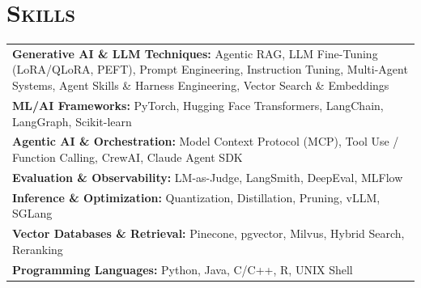 \documentclass[letterpaper,11pt]{article} %
\begin{document}
\section{\Large\bf\textsc{Skills}}
\begin{tabular}{p{18.5cm}}
{\bf Generative AI \& LLM Techniques:} Agentic RAG, LLM Fine-Tuning (LoRA/QLoRA, PEFT), Prompt Engineering, Instruction Tuning, Multi-Agent Systems, Agent Skills \& Harness Engineering, Vector Search \& Embeddings\\
{\bf ML/AI Frameworks:} PyTorch, Hugging Face Transformers, LangChain, LangGraph, Scikit-learn \\
{\bf Agentic AI \& Orchestration:} Model Context Protocol (MCP), Tool Use / Function Calling, CrewAI, Claude Agent SDK\\
{\bf Evaluation \& Observability:} LM-as-Judge, LangSmith, DeepEval, MLFlow\\
{\bf Inference \& Optimization:} Quantization, Distillation, Pruning, vLLM, SGLang\\
{\bf Vector Databases \& Retrieval:} Pinecone, pgvector, Milvus, Hybrid Search, Reranking\\
{\bf Programming Languages:} Python, Java, C/C++, R, UNIX Shell\\
\end{tabular}






\end{document}

